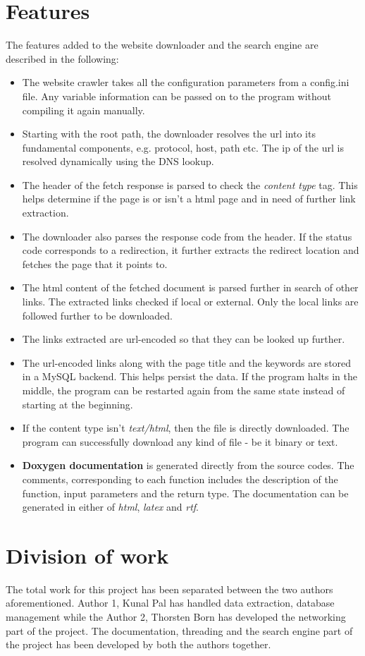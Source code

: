 \documentclass{project_report}
\begin{document}
\section{Features}
The features added to the website downloader and the search engine are described in the following:
\begin{itemize}
	\item The website crawler takes all the configuration parameters from a config.ini file. Any variable information can be passed on to the program without compiling it again manually.
	\item Starting with the root path, the downloader resolves the url into its fundamental components, e.g. protocol, host, path etc. The ip of the url is resolved dynamically using the DNS lookup.
	\item The header of the fetch response is parsed to check the \emph{content type} tag. This helps determine if the page is or isn't a html page and in need of further link extraction.
	\item The downloader also parses the response code from the header. If the status code corresponds to a redirection, it further extracts the redirect location and fetches the page that it points to.
	\item The html content of the fetched document is parsed further in search of other links. The extracted links checked if local or external. Only the local links are followed further to be downloaded.
	\item The links extracted are url-encoded so that they can be looked up further.
	\item The url-encoded links along with the page title and the keywords are stored in a MySQL backend. This helps persist the data. If the program halts in the middle, the program can be restarted again from the same state instead of starting at the beginning.
	\item If the content type isn't \emph{text/html}, then the file is directly downloaded. The program can successfully download any kind of file - be it binary or text.
	\item \textbf{Doxygen documentation} is generated directly from the source codes. The comments, corresponding to each function includes the description of the function, input parameters and the return type. The documentation can be generated in either of \emph{html}, \emph{latex} and \emph{rtf}.
\end{itemize}

\section{Division of work}
The total work for this project has been separated between the two authors aforementioned. Author 1, Kunal Pal has handled data extraction, database management while the Author 2, Thorsten Born has developed the networking part of the project. The documentation, threading and the search engine part of the project has been developed by both the authors together.
\end{document}

